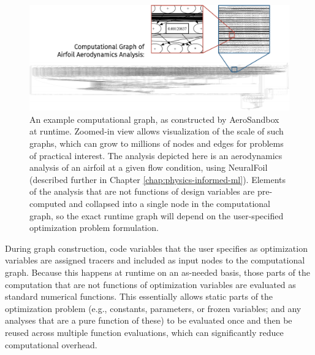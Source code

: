 \begin{figure}[htbp!]
    \centering
    \includegraphics[width=\textwidth]{../figures/large_computational_graph-crop.pdf}
    \caption{An example computational graph, as constructed by AeroSandbox at runtime. Zoomed-in view allows visualization of the scale of such graphs, which can grow to millions of nodes and edges for problems of practical interest. The analysis depicted here is an aerodynamics analysis of an airfoil at a given flow condition, using NeuralFoil (described further in Chapter \ref{chap:physics-informed-ml}). Elements of the analysis that are not functions of design variables are pre-computed and collapsed into a single node in the computational graph, so the exact runtime graph will depend on the user-specified optimization problem formulation.}
    \label{fig:computational-graph-aerosandbox}
\end{figure}

During graph construction, code variables that the user specifies as optimization variables are assigned tracers and included as input nodes to the computational graph. Because this happens at runtime on an as-needed basis, those parts of the computation that are not functions of optimization variables are evaluated as standard numerical functions. This essentially allows static parts of the optimization problem (e.g., constants, parameters, or frozen variables; and any analyses that are a pure function of these) to be evaluated once and then be reused across multiple function evaluations, which can significantly reduce computational overhead.

